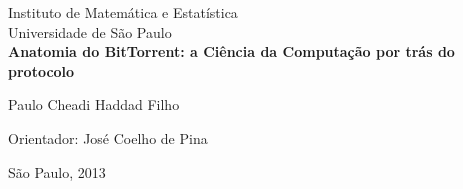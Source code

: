 \documentclass[a4paper, 11pt, oneside, brazil]{book}
\begin{document}
\thispagestyle{empty}
\frontmatter

\begin{center}
	\large
		Instituto de Matemática e Estatística\\
		Universidade de São Paulo\\[-0.25cm]

	\vspace*{5.5cm}
	\textbf{\Large Anatomia do BitTorrent: a Ciência da Computação por trás do protocolo}

	\vspace*{2.0cm}

	\Large{Paulo Cheadi Haddad Filho} 

	\vskip 0.6cm
	Orientador: José Coelho de Pina

	\vspace*{\fill}
	\normalsize{São Paulo, 2013}
\end{center}

\pagebreak


\tableofcontents
\printglossaries
\listoffigures

\begin{comment}
	\setstretch{1.5}  %
	\clearpage  %

	\listofsymbols{ll}  %
	{

	}
\end{comment}

\clearpage

\addtolength{\parskip}{\baselineskip}

\mainmatter










\end{document}
